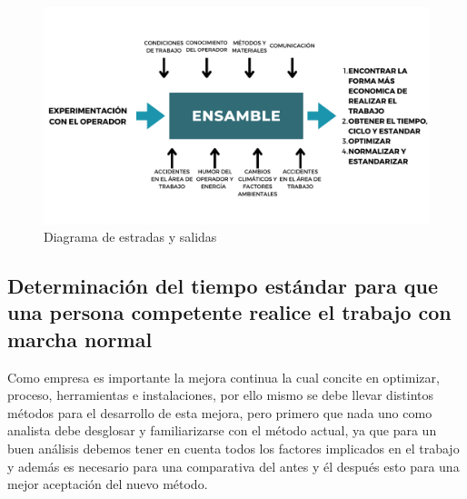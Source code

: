     \begin{figure}[H] 
        \centering
        \includegraphics[trim = {12mm 20mm 10mm 14mm},clip,scale=0.33]{22/Img/diagramaEntradasSalidas.pdf}
        \caption{Diagrama de estradas y salidas}
        \label{fig:diagrama}
    \end{figure}
    
    \subsection{Determinación del tiempo estándar para que una persona competente realice el trabajo con marcha normal}
    
    
    
    Como empresa es importante la mejora continua la cual concite en optimizar, proceso, herramientas e instalaciones, por ello mismo se debe llevar distintos métodos para el desarrollo de esta mejora, pero primero que nada uno como analista debe desglosar y familiarizarse con el método actual, ya que para un buen análisis debemos tener en cuenta todos los factores implicados en el trabajo y además es necesario para una comparativa del antes y él después esto para una mejor aceptación del nuevo método.
    

